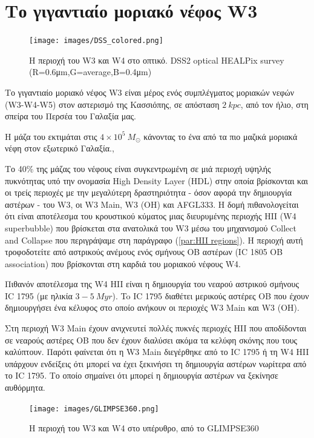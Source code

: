 \documentclass[a4paper,12pt]{memoir}
\newcommand{\e}[1]{\times 10^{#1}}
\begin{document}
\chapter{Το γιγαντιαίο μοριακό νέφος W3}

\begin{figure}[h]
	\centering
	\texttt{[image: images/DSS\_colored.png]}
	\caption{Η περιοχή του W3 και W4 στο οπτικό. DSS2 optical HEALPix survey (R=0.6μm,G=average,B=0.4μm)}
\end{figure}

Το γιγαντιαίο μοριακό νέφος W3 είναι μέρος ενός συμπλέγματος μοριακών νεφών (W3-W4-W5) στον αστερισμό της Κασσιόπης, σε απόσταση $2 \ kpc$\cite{Xu_2006},\cite{Hachisuka_2006} από τον ήλιο, στη σπείρα του Περσέα του Γαλαξία μας.

Η μάζα του εκτιμάται στις $4\e{5} \ M_{\odot}$ κάνοντας το ένα από τα πιο μαζικά μοριακά νέφη στον εξωτερικό Γαλαξία.\cite{moore_2007},\cite{polychroni_gas_2012}

Το 40\% της μάζας του νέφους είναι συγκεντρωμένη σε μιά περιοχή υψηλής πυκνότητας υπό την ονομασία High Density Layer (HDL) στην οποία βρίσκονται και οι τρείς περιοχές με την μεγαλύτερη δραστηριότητα - όσον αφορά την δημιουργία αστέρων - του W3, οι W3 Main, W3 (OH) και AFGL333. Η δομή πιθανολογείται ότι είναι αποτέλεσμα του κρουστικού κύματος μιας διευρυμένης περιοχής HII (W4 superbubble) που βρίσκεται στα ανατολικά του W3 μέσω του μηχανισμού Collect and Collapse που περιγράψαμε στη παράγραφο (\ref{par:HII regions}). Η περιοχή αυτή τροφοδοτείτε από αστρικούς ανέμους ενός σμήνους OB αστέρων (IC 1805 OB association) που βρίσκονται στη καρδιά του μοριακού νέφους W4.

Πιθανόν αποτέλεσμα της W4 HII είναι η δημιουργία του νεαρού αστρικού σμήνους IC 1795 (με ηλικία $3-5 \ Myr$)\cite{rivera-ingraham_2011}. To IC 1795 διαθέτει μερικούς αστέρες OB που έχουν δημιουργήσει ένα κέλυφος στο οποίο ανήκουν οι περιοχές W3 Main και W3 (OH).

Στη περιοχή W3 Main έχουν ανιχνευτεί πολλές πυκνές περιοχές HII που αποδίδονται σε νεαρούς αστέρες OB που δεν έχουν διαλύσει ακόμα τα κελύφη σκόνης που τους καλύπτουν. Παρότι φαίνεται ότι η W3 Main διεγέρθηκε από το IC 1795 ή τη W4 HII υπάρχουν ενδείξεις ότι μπορεί να έχει ξεκινήσει τη δημιουργία αστέρων νωρίτερα από το IC 1795\cite{feigelson_2008}. Το οποίο σημαίνει ότι μπορεί η δημιουργία αστέρων να ξεκίνησε αυθόρμητα.


\begin{figure}[h]
	\centering
	\texttt{[image: images/GLIMPSE360.png]}
	\caption{Η περιοχή του W3 και W4 στο υπέρυθρο, από το GLIMPSE360}
\end{figure}
\end{document}
